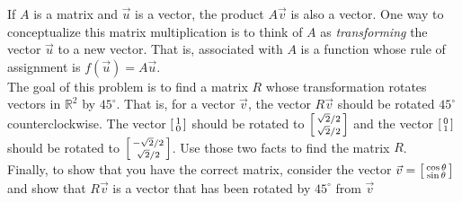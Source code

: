 \documentclass[]{exam}
\newenvironment{smallbmatrix}
{\left[\begin{smallmatrix}}
{\end{smallmatrix}\right]}
\begin{document}
\begin{questions}
\begin{solution}
	\end{solution}
	\question If $A$ is a matrix and $\vec{u}$ is a vector, the product $A\vec{v}$ is also a vector. One way to conceptualize this matrix multiplication is to think of $A$ as \emph{transforming} the vector $\vec{u}$ to a new vector. That is, associated with $A$ is a function whose rule of assignment is $f(\vec{u}) = A\vec{u}$. \\ The goal of this problem is to find a matrix $R$ whose transformation rotates vectors in $\mathbb{R}^2$ by $45^\circ$. That is, for a vector $\vec{v}$, the vector $R\vec{v}$ should be rotated $45^\circ$ counterclockwise. The vector $\begin{smallbmatrix}1 \\0 \end{smallbmatrix}$ should be rotated to $\begin{smallbmatrix} \sqrt{2}/2 \\ \sqrt{2}/2 \end{smallbmatrix}$ and the vector $\begin{smallbmatrix}0 \\1 \end{smallbmatrix}$ should be rotated to $\begin{smallbmatrix} -\sqrt{2}/2 \\ \sqrt{2}/2 \end{smallbmatrix}$. Use those two facts to find the matrix $R$. \\ Finally, to show that you have the correct matrix, consider the vector $\vec{v} = \begin{smallbmatrix} \cos\theta \\ \sin\theta \end{smallbmatrix}$ and show that $R\vec{v}$ is a vector that has been rotated by $45^\circ$ from $\vec{v}$
	

\end{questions}
\end{document}
